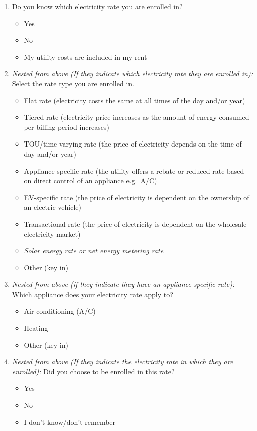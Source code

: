 \documentclass{article}
\begin{document}
\begin{enumerate}
\item Do you know which electricity rate you are enrolled in?
\begin{itemize}
  \item[\checkbox] Yes
  \item[\checkbox] No
  \item[\checkbox] My utility costs are included in my rent
\end{itemize}
 

\item \textit{Nested from above (If they indicate which electricity rate they are enrolled in):}
Select the rate type you are enrolled in.
\begin{itemize}
  \item[\checkbox] Flat rate (electricity costs the same at all times of the day and/or year)
  \item[\checkbox] Tiered rate (electricity price increases as the amount of energy consumed per billing period increases)
  \item[\checkbox] TOU/time-varying rate (the price of electricity depends on the time of day and/or year)
  \item[\checkbox] Appliance-specific rate (the utility offers a rebate or reduced rate based on direct control of an appliance e.g.\ A/C)
  \item[\checkbox] EV-specific rate (the price of electricity is dependent on the ownership of an electric vehicle)
  \item[\checkbox] Transactional rate (the price of electricity is dependent on the wholesale electricity market)
  \item[\checkbox] \textit{Solar energy rate or net energy metering rate}
  \item[\checkbox] Other (key in)
\end{itemize}
 

\item \textit{Nested from above (if they indicate they have an appliance-specific rate):}
Which appliance does your electricity rate apply to?
\begin{itemize}
  \item[\checkbox] Air conditioning (A/C)
  \item[\checkbox] Heating
  \item[\checkbox] Other (key in)
\end{itemize}
 

\item \textit{Nested from above (If they indicate the electricity rate in which they are enrolled):}
Did you choose to be enrolled in this rate?
\begin{itemize}
  \item[\checkbox] Yes
  \item[\checkbox] No
  \item[\checkbox] I don't know/don't remember
\end{itemize}
 


\end{enumerate}
\end{document}
